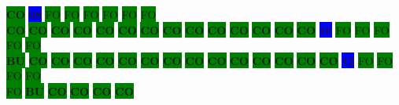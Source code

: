 \colorbox{green}{\color[rgb]{0,0,0}\textbf{CO}}%
\colorbox{blue}{\color[rgb]{1,0,0}\textbf{08}}%
\colorbox{green}{\color[gray]{0.75}FO}%
\colorbox{green}{\color[gray]{0.75}FO}%
\colorbox{green}{\color[gray]{0.75}FO}%
\colorbox{green}{\color[gray]{0.75}FO}%
\colorbox{green}{\color[gray]{0.75}FO}%
\colorbox{green}{\color[gray]{0.75}FO}%
\\
\colorbox{green}{\color[rgb]{0,0,0}\textbf{CO}}%
\colorbox{green}{\color[rgb]{0,0,0}\textbf{CO}}%
\colorbox{green}{\color[rgb]{0,0,0}\textbf{CO}}%
\colorbox{green}{\color[rgb]{0,0,0}\textbf{CO}}%
\colorbox{green}{\color[rgb]{0,0,0}\textbf{CO}}%
\colorbox{green}{\color[rgb]{0,0,0}\textbf{CO}}%
\colorbox{green}{\color[rgb]{0,0,0}\textbf{CO}}%
\colorbox{green}{\color[rgb]{0,0,0}\textbf{CO}}%
\colorbox{green}{\color[rgb]{0,0,0}\textbf{CO}}%
\colorbox{green}{\color[rgb]{0,0,0}\textbf{CO}}%
\colorbox{green}{\color[rgb]{0,0,0}\textbf{CO}}%
\colorbox{green}{\color[rgb]{0,0,0}\textbf{CO}}%
\colorbox{green}{\color[rgb]{0,0,0}\textbf{CO}}%
\colorbox{green}{\color[rgb]{0,0,0}\textbf{CO}}%
\colorbox{blue}{\color[rgb]{1,0,0}\textbf{10}}%
\colorbox{green}{\color[gray]{0.75}FO}%
\colorbox{green}{\color[gray]{0.75}FO}%
\colorbox{green}{\color[gray]{0.75}FO}%
\colorbox{green}{\color[gray]{0.75}FO}%
\colorbox{green}{\color[gray]{0.75}FO}%
\\
\colorbox{green}{\color[rgb]{1,0,0}\textbf{BU}}%
\colorbox{green}{\color[rgb]{0,0,0}\textbf{CO}}%
\colorbox{green}{\color[rgb]{0,0,0}\textbf{CO}}%
\colorbox{green}{\color[rgb]{0,0,0}\textbf{CO}}%
\colorbox{green}{\color[rgb]{0,0,0}\textbf{CO}}%
\colorbox{green}{\color[rgb]{0,0,0}\textbf{CO}}%
\colorbox{green}{\color[rgb]{0,0,0}\textbf{CO}}%
\colorbox{green}{\color[rgb]{0,0,0}\textbf{CO}}%
\colorbox{green}{\color[rgb]{0,0,0}\textbf{CO}}%
\colorbox{green}{\color[rgb]{0,0,0}\textbf{CO}}%
\colorbox{green}{\color[rgb]{0,0,0}\textbf{CO}}%
\colorbox{green}{\color[rgb]{0,0,0}\textbf{CO}}%
\colorbox{green}{\color[rgb]{0,0,0}\textbf{CO}}%
\colorbox{green}{\color[rgb]{0,0,0}\textbf{CO}}%
\colorbox{green}{\color[rgb]{0,0,0}\textbf{CO}}%
\colorbox{blue}{\color[rgb]{1,0,0}\textbf{12}}%
\colorbox{green}{\color[gray]{0.75}FO}%
\colorbox{green}{\color[gray]{0.75}FO}%
\colorbox{green}{\color[gray]{0.75}FO}%
\colorbox{green}{\color[gray]{0.75}FO}%
\\
\colorbox{green}{\color[gray]{0.75}FO}%
\colorbox{green}{\color[rgb]{1,0,0}\textbf{BU}}%
\colorbox{green}{\color[rgb]{0,0,0}\textbf{CO}}%
\colorbox{green}{\color[rgb]{0,0,0}\textbf{CO}}%
\colorbox{green}{\color[rgb]{0,0,0}\textbf{CO}}%
\colorbox{green}{\color[rgb]{0,0,0}\textbf{CO}}%

